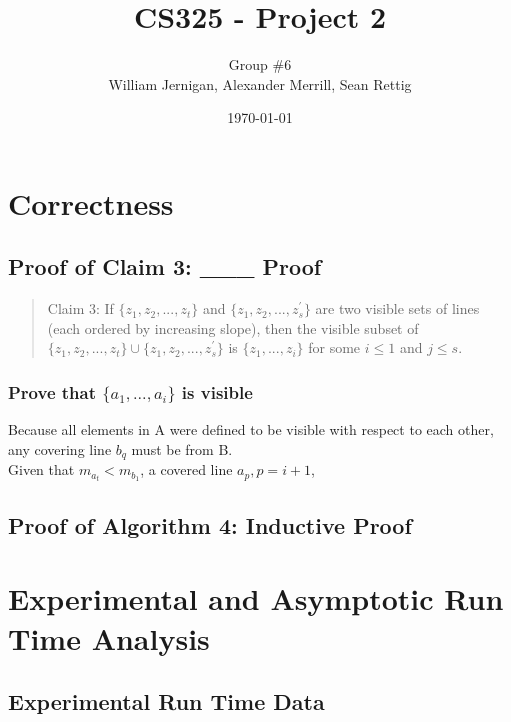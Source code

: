 \documentclass{article}
\title{CS325 - Project 2}
\author{Group \#6 \\ William Jernigan, Alexander Merrill, Sean Rettig}
\date{\today}
\begin{document}
\maketitle

\section*{Correctness}
\subsection*{Proof of Claim 3: ___ Proof}

\begin{quote}
Claim 3: If $\{z_{1},z_{2},...,z_{t}\}$ and $\{z_{1},z_{2},...,z_{s}^{'}\}$ are two visible sets of lines (each ordered by increasing slope), then the visible subset of $\{z_{1},z_{2},...,z_{t}\}\cup\{z_{1},z_{2},...,z_{s}^{'}\}$ is $\{z_{1},...,z_{i}\}$ for some $i \leq 1$ and $j \leq s$.
\end{quote}

\subsubsection*{Prove that $\{a_{1},...,a_{i}\}$ is visible}
Because all elements in A were defined to be visible with respect to each other, any covering line $b_{q}$ must be from B.\\
Given that $m_{a_{t}} < m_{b_{1}}$, a covered line $a_{p}, p = i + 1$,

\subsection*{Proof of Algorithm 4: Inductive Proof}


\section*{Experimental and Asymptotic Run Time Analysis}
\subsection*{Experimental Run Time Data}


\pagebreak
\end{document}
